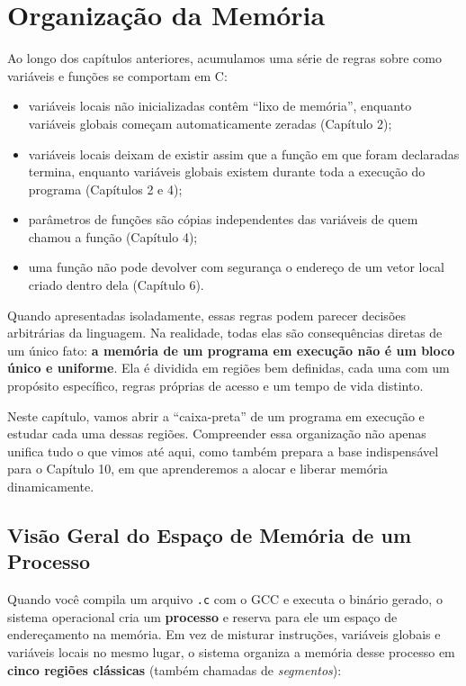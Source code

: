 \chapter{Organização da Memória}

Ao longo dos capítulos anteriores, acumulamos uma série de regras sobre como variáveis e funções se comportam em C:

\begin{itemize}
    \item variáveis locais não inicializadas contêm ``lixo de memória'', enquanto variáveis globais começam automaticamente zeradas (Capítulo 2);
    \item variáveis locais deixam de existir assim que a função em que foram declaradas termina, enquanto variáveis globais existem durante toda a execução do programa (Capítulos 2 e 4);
    \item parâmetros de funções são cópias independentes das variáveis de quem chamou a função (Capítulo 4);
    \item uma função não pode devolver com segurança o endereço de um vetor local criado dentro dela (Capítulo 6).
\end{itemize}

Quando apresentadas isoladamente, essas regras podem parecer decisões arbitrárias da linguagem. Na realidade, todas elas são consequências diretas de um único fato: \textbf{a memória de um programa em execução não é um bloco único e uniforme}. Ela é dividida em regiões bem definidas, cada uma com um propósito específico, regras próprias de acesso e um tempo de vida distinto.

Neste capítulo, vamos abrir a ``caixa-preta'' de um programa em execução e estudar cada uma dessas regiões. Compreender essa organização não apenas unifica tudo o que vimos até aqui, como também prepara a base indispensável para o Capítulo 10, em que aprenderemos a alocar e liberar memória dinamicamente.

\section{Visão Geral do Espaço de Memória de um Processo}
\label{sec:visao-geral-memoria}

Quando você compila um arquivo \texttt{.c} com o GCC e executa o binário gerado, o sistema operacional cria um \textbf{processo} e reserva para ele um espaço de endereçamento na memória. Em vez de misturar instruções, variáveis globais e variáveis locais no mesmo lugar, o sistema organiza a memória desse processo em \textbf{cinco regiões clássicas} (também chamadas de \textit{segmentos}):

